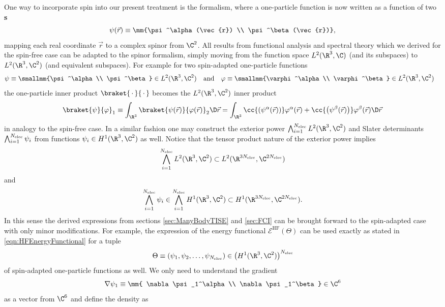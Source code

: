 \begin{rem}
	One way to incorporate spin into our present treatment
	is the  formalism,
	where a one-particle function is now written as a function of two
	\textbf{s}
	\begin{equation}
		\psi(\vec{r}) \equiv \mm{\psi^\alpha(\vec{r}) \\ \psi^\beta(\vec{r})},
		\label{eqn:OneParticleSpinor}
	\end{equation}
	mapping each real coordinate $\vec{r}$ to a complex spinor from $\C^2$.
	All results from functional analysis and spectral theory
	which we derived for the spin-free case can be adapted to the
	spinor formalism,
	simply moving from the function space $L^2(\R^3, \C)$
	(and its subspaces) to $L^2(\R^3, \C^2)$ (and equivalent subspaces).
	For example for two spin-adapted one-particle functions
	\begin{align*}
		\psi &\equiv \smallmm{\psi^\alpha\\ \psi^\beta} \in L^2(\R^3, \C^2)
		&&\text{and} &
		\varphi &\equiv \smallmm{\varphi^\alpha\\ \varphi^\beta} \in L^2(\R^3, \C^2)
	\end{align*}
	the one-particle inner product $\braket{\slot}{\slot}$ becomes
	the $L^2(\R^3, \C^2)$ inner product
	\[ \braket{\psi}{\varphi}_1 \equiv
		\int_{\R^3} \braket{\psi(\vec{r})}{\varphi(\vec{r})}_{2} \D \vec{r}
		= \int_{\R^3}
			\cc{\left(\psi^\alpha(\vec{r})\right)} \varphi^\alpha(\vec{r})
			+
			\cc{\left(\psi^\beta(\vec{r})\right)} \varphi^\beta(\vec{r})
		\D \vec{r}
	\]
	in analogy to the spin-free case.
	In a similar fashion one may construct the exterior power
	$\bigwedge_{i=1}^{\Nelec} L^2(\R^3, \C^2)$
	and Slater determinants $\bigwedge_{i=1}^{N_\text{elec}} \psi_i$
	from functions $\psi_i \in H^1(\R^3, \C^2)$ as well.
	Notice that the tensor product nature of the exterior power implies
	\[ \bigwedge_{i=1}^{\Nelec} L^2(\R^3, \C^2) \subset L^2(\R^{3\Nelec}, \C^{2\Nelec}) \]
	and
	\begin{equation}
		\bigwedge_{i=1}^{\Nelec} \psi_i \in \bigwedge_{i=1}^{\Nelec} H^1(\R^3, \C^2)
		\subset H^1(\R^{3\Nelec}, \C^{2\Nelec}).
		\label{eqn:SpinAnsatzSpace}
	\end{equation}
	In this sense the derived expressions
	from sections \ref{sec:ManyBodyTISE} and \ref{sec:FCI}
	can be brought forward to the spin-adapted case with only minor modifications.
	For example, the expression of the \HF energy functional
	$\mathcal{E}^\text{HF}(\Theta)$ can be used exactly as stated in
	\eqref{eqn:HFEnergyFunctional}
	for a tuple
	\[ \Theta \equiv \left(\psi_1, \psi_2, \ldots, \psi_{\Nelec}\right)
		\in \left(H^1(\R^3, \C^2)\right)^{\Nelec} \]
	of spin-adapted one-particle functions as well.
	We only need to understand the gradient
	\[ \nabla \psi_1 \equiv \mm{ \nabla \psi_1^\alpha \\ \nabla \psi_1^\beta } \in \C^6 \]
	as a vector from $\C^6$
	and define the density as


\end{rem}
